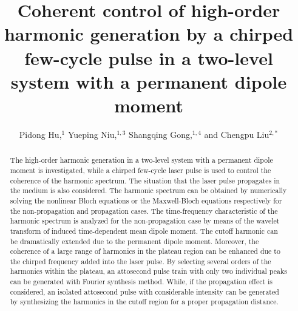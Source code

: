 \documentclass[10pt,letterpaper]{article}
\begin{document}
\title{Coherent control of high-order harmonic generation by a chirped few-cycle pulse in a two-level system with a permanent dipole moment}

\author{Pidong Hu,$^1$ Yueping Niu,$^{1,3}$ Shangqing Gong,$^{1,4}$  and Chengpu Liu$^{2,*}$}

\address{$^1$Department of Physics, East China University of Science and Technology, \\
Meilong Road 130, Shanghai 200237, China\\
$^2$State Key Laboratory of High Field Laser Physics, Shanghai Institute of Optics and Fine Mechanics, Chinese Academy of Sciences, Qinghe Road 390, Shanghai 201800, China\\
$^{3}$niuyp@ecust.edu.cn\\
$^{4}$sqgong@ecust.edu.cn
}




\begin{abstract}
The high-order harmonic generation in a two-level system with a permanent dipole moment is investigated, while a chirped few-cycle laser pulse is used to control the coherence of the harmonic spectrum. The situation that the laser pulse propagates in the medium is also considered. The harmonic spectrum can be obtained by numerically solving the nonlinear Bloch equations or the Maxwell-Bloch equations respectively for the non-propagation and propagation cases. The time-frequency characteristic of the harmonic spectrum is analyzed for the non-propagation case by means of the wavelet transform of induced time-dependent mean dipole moment. The cutoff harmonic can be dramatically extended due to the permanent dipole moment. Moreover, the coherence of a large range of harmonics in the plateau region can be enhanced due to the chirped frequency added into the laser pulse. By selecting several orders of the harmonics within the plateau, an attosecond pulse train with only two individual peaks can be generated with Fourier synthesis method. While, if the propagation effect is considered, an isolated attosecond pulse with considerable intensity can be generated by synthesizing the harmonics in the cutoff region for a proper propagation distance.
\end{abstract}
\end{document}
